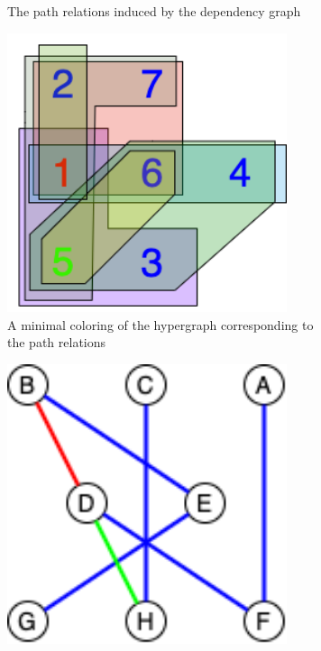 \begin{figure}
\begin{subfigure}{0.24\textwidth}
        \caption{The path relations induced by the dependency graph}\label{fig:path-relations}
    \end{subfigure}
    \begin{subfigure}{0.24\textwidth}
        \includegraphics[width=0.9\textwidth]{figures/hypergraph_coloring/colored_dependency_hypergraph.drawio.png}
        \caption{A minimal coloring of the hypergraph corresponding to the path relations}\label{fig:colored-hypergraph}
    \end{subfigure}
    \begin{subfigure}{0.24\textwidth}
        \includegraphics[width=0.9\textwidth]{figures/hypergraph_coloring/colored_dependency_graph.drawio.png}

\end{subfigure}
\end{figure}
